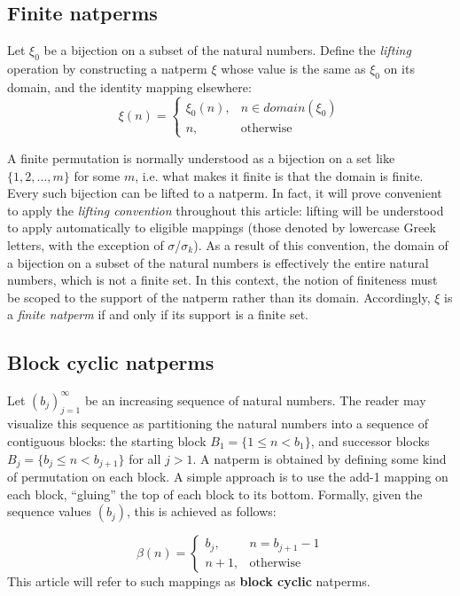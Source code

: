 \documentclass[12pt,reqno]{article}
\begin{document}
\subsection{Finite natperms}

Let $\xi_0$ be a bijection on a subset of the natural numbers. Define the \textit{lifting} operation by constructing a natperm $\xi$ whose value is the same as $\xi_0$ on its domain, and the identity mapping elsewhere:
\begin{equation}
  \xi(n) = \begin{cases}
    \xi_0(n), & n \in domain(\xi_0) \\
    n, & \text{otherwise}
  \end{cases}
\end{equation}

A finite permutation is normally understood as a bijection on a set like $\{ 1, 2, \ldots, m \}$ for some $m$, i.e. what makes it finite is that the domain is finite. Every such bijection can be lifted to a natperm. In fact, it will prove convenient to apply the \textit{lifting convention} throughout this article: lifting will be understood to apply automatically to eligible mappings (those denoted by lowercase Greek letters, with the exception of $\sigma$/$\sigma_k$). As a result of this convention, the domain of a bijection on a subset of the natural numbers is effectively the entire natural numbers, which is not a finite set. In this context, the notion of finiteness must be scoped to the support of the natperm rather than its domain. Accordingly, $\xi$ is a \textit{finite natperm} if and only if its support is a finite set.

\subsection{Block cyclic natperms}

Let $(b_j)_{j=1}^{\infty}$ be an increasing sequence of natural numbers. The reader may visualize this sequence as partitioning the natural numbers into a sequence of contiguous blocks: the starting block $B_1 = \{ 1 \leq n < b_1 \}$, and successor blocks $B_j = \{ b_j \leq n < b_{j+1} \}$ for all $j > 1$. A natperm is obtained by defining some kind of permutation on each block. A simple approach is to use the add-1 mapping on each block, ``gluing'' the top of each block to its bottom. Formally, given the sequence values $(b_j)$, this is achieved as follows:

\begin{equation}
  \beta(n) = \begin{cases}
    b_j, & n = b_{j+1} - 1 \\
    n + 1, & \text{otherwise}
  \end{cases}
\end{equation}
This article will refer to such mappings as \textbf{block cyclic} natperms. 
\end{document}
